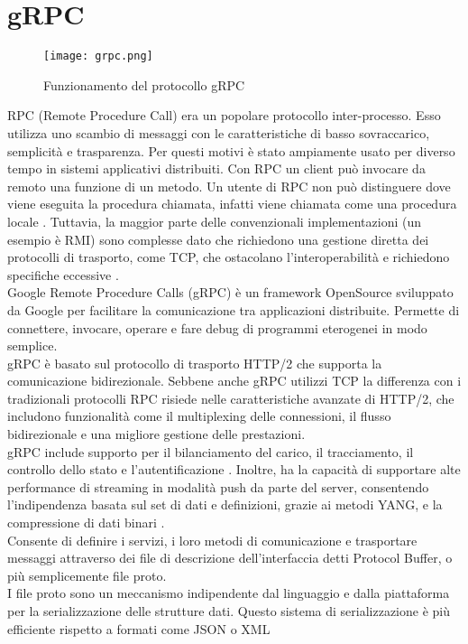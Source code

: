 \section{gRPC} \label{grpc}
\begin{figure}[h]
    \centering
   \texttt{[image: grpc.png]}
    \caption{Funzionamento del protocollo gRPC \cite{librogrpc}}
    \label{fig:grpc}
\end{figure}
RPC (Remote Procedure Call) era un popolare protocollo inter-processo\cite{librogrpc}.
Esso utilizza uno scambio di messaggi con le caratteristiche di basso sovraccarico, semplicità e trasparenza.
Per questi motivi è stato ampiamente usato per diverso tempo in sistemi applicativi distribuiti.
Con RPC un client può invocare da remoto una funzione di un metodo.
Un utente di RPC non può distinguere dove viene eseguita la procedura chiamata, infatti viene chiamata come una procedura locale \cite{grpcArt2}.
Tuttavia, la maggior parte delle convenzionali implementazioni (un esempio è RMI) sono complesse dato che richiedono una gestione diretta dei protocolli di trasporto, come TCP, che ostacolano l'interoperabilità e richiedono specifiche eccessive \cite{librogrpc}.
\\Google Remote Procedure Calls (gRPC\cite{grpc}) è un framework OpenSource sviluppato da Google per facilitare la comunicazione tra applicazioni distribuite. Permette di
connettere, invocare, operare e fare debug di programmi eterogenei in modo semplice.
\\gRPC è basato sul protocollo di trasporto HTTP/2 che supporta la comunicazione bidirezionale. 
Sebbene anche gRPC utilizzi TCP la differenza con i tradizionali protocolli RPC risiede nelle caratteristiche avanzate di HTTP/2, che includono funzionalità come il multiplexing delle connessioni, il flusso bidirezionale 
e una migliore gestione delle prestazioni. 
\\gRPC include supporto per il bilanciamento del carico, il tracciamento, il controllo dello stato e l'autentificazione\cite{grpcArt3} \cite{grpcArt1}.
Inoltre, ha la capacità di supportare alte performance di streaming in modalità push da parte del server, consentendo l'indipendenza basata sul set di dati e definizioni, grazie ai metodi YANG,
e la compressione di dati binari \cite{grpcArt3}.
\\Consente di definire i servizi, i loro metodi di comunicazione e trasportare messaggi attraverso dei file di descrizione dell'interfaccia detti Protocol Buffer, o più semplicemente file proto.
\\I file proto sono un meccanismo indipendente dal linguaggio e dalla piattaforma per la serializzazione delle strutture dati. Questo sistema di serializzazione è più efficiente rispetto a formati come JSON o XML
